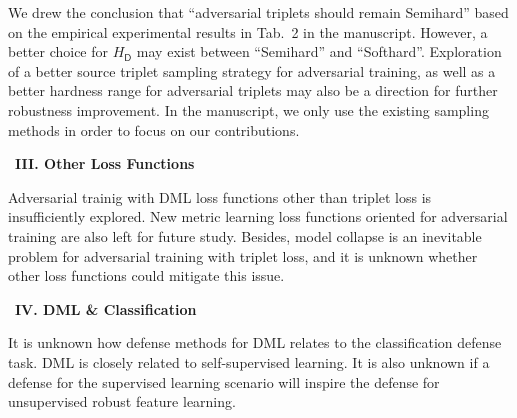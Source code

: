 We drew the conclusion that ``adversarial triplets should remain Semihard''
based on the empirical experimental results in Tab.~2 in the manuscript.
%
However, a better choice for $H_\mathsf{D}$ may exist between ``Semihard''
and ``Softhard''.
%
Exploration of a better source triplet sampling strategy for adversarial
training, as well as a better hardness range for adversarial triplets
may also be a direction for further robustness improvement.
%
In the manuscript, we only use the existing sampling methods in order to focus
on our contributions.

~\newline\textbf{III. Other Loss Functions}

Adversarial trainig with DML loss functions other than triplet loss is
insufficiently explored.
%
New metric learning loss functions oriented for adversarial training are also
left for future study.
%
Besides, model collapse is an inevitable problem for adversarial training
with triplet loss, and it is unknown whether other loss functions could
mitigate this issue.


~\newline\textbf{IV. DML \& Classification}

It is unknown how defense methods for DML relates to the classification defense
task.
%
DML is closely related to self-supervised learning.
%
It is also unknown if a defense for the supervised learning scenario will
inspire the defense for unsupervised robust feature learning.

\begin{comment}
	
 [T] By incorporating the idea of on-manifold adversarial example to
	adversarial training, the performance on benign example is greatly
	improved.
	That idea can be interpreted as to be selective on the adversarial example
	used for trianing.
	Here, in our observation, we are also selective on the adversarial examples
	used for training.
	Is there anything in common?

[TODO LIST]

Before deadline

* Revise figures

* Revise manuscript

After deadline: supplementary

* add discussions and additional experiments
\end{comment}


